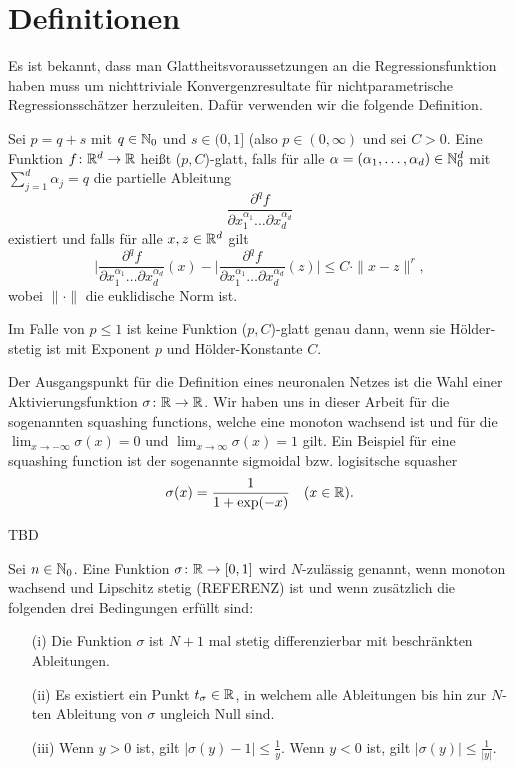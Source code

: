 \section{Definitionen}
Es ist bekannt, dass man Glattheitsvoraussetzungen an die Regressionsfunktion haben muss um nichttriviale Konvergenzresultate für nichtparametrische Regressionsschätzer herzuleiten. Dafür verwenden wir die folgende Definition.
\begin{defn}[($p,C$)-Glattheit]
\label{def:pc}
   Sei $p = q + s$ mit $q \in \mathbb{N}_0$ und $s \in (0,1]$ (also $p \in (0, \infty)$ und sei $C > 0$. Eine Funktion $f\colon \mathbb{R}^d \to \mathbb{R}$ heißt ($p, C$)-glatt, falls für alle $\alpha = (\alpha_1,\dots,\alpha_d) \in \mathbb{N}_0^d$ mit $\sum_{j = 1}^{d}\alpha_j = q$ die partielle Ableitung 
   $$ \frac{\partial^qf}{\partial x_1^{\alpha_1}\dots\partial x_d^{\alpha_d}}$$
   existiert und falls für alle $x, z \in \mathbb{R}^d$ gilt
   $$ \bigg|\frac{\partial^qf}{\partial x_1^{\alpha_1}\dots\partial x_d^{\alpha_d}}(x) - \bigg|\frac{\partial^qf}{\partial x_1^{\alpha_1}\dots\partial x_d^{\alpha_d}}(z) \bigg| \leq C \cdot \|x - z\|^r,$$
   wobei $\|\cdot\|$ die euklidische Norm ist.  
\end{defn}
\begin{bemnumber}
Im Falle von $p \leq 1$ ist keine Funktion ($p, C$)-glatt genau dann, wenn sie Hölder-stetig ist mit Exponent $p$ und Hölder-Konstante $C$.
\end{bemnumber}

Der Ausgangspunkt für die Definition eines neuronalen Netzes ist die Wahl einer Aktivierungsfunktion $\sigma\colon \mathbb{R} \to \mathbb{R}$. Wir haben uns in dieser Arbeit für die sogenannten \glqq squashing functions\grqq, welche eine monoton wachsend ist und für die $\lim_{x \to -\infty}\sigma(x) = 0$ und $\lim_{x \to \infty}\sigma(x) = 1$ gilt. Ein Beispiel für eine squashing function ist der sogenannte sigmoidal bzw. logisitsche squasher
\begin{align}
\label{logsquasher}
\sigma(x) = \frac{1}{1 + \exp(-x)} \quad (x \in \mathbb{R}).
\end{align}

TBD

\begin{defn}
\label{nzulässig}
Sei $n \in \mathbb{N}_0$. Eine Funktion $\sigma\colon \mathbb{R} \to [0, 1]$ wird $N$-zulässig genannt, wenn monoton wachsend und Lipschitz stetig (REFERENZ) ist und wenn zusätzlich die folgenden drei Bedingungen erfüllt sind$\colon$
\begin{itemize}
\item[(i)] Die Funktion $\sigma$ ist $N + 1$ mal stetig differenzierbar mit beschränkten Ableitungen.
\item[(ii)] Es existiert ein Punkt $t_{\sigma} \in \mathbb{R}$, in welchem alle Ableitungen bis hin zur $N$-ten Ableitung von $\sigma$ ungleich Null sind.
\item[(iii)] Wenn $y > 0$ ist, gilt $|\sigma(y) - 1| \leq \frac{1}{y}$. Wenn $y < 0$ ist, gilt $|\sigma(y)| \leq \frac{1}{|y|}$.
\end{itemize}  
\end{defn}  

